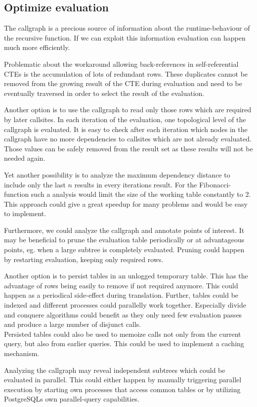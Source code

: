 \subsection{Optimize evaluation}

The callgraph is a precious source of information about the runtime-behaviour of the recursive function. If we can exploit this information evaluation can happen much more efficiently.

Problematic about the workaround allowing back-references in self-referential CTEs is the accumulation of lots of redundant rows. These duplicates cannot be removed from the growing result of the CTE during evaluation and need to be eventually traversed in order to select the result of the evaluation.

Another option is to use the callgraph to read only those rows which are required by later callsites. In each iteration of the evaluation, one topological level of the callgraph is evaluated. It is easy to check after each iteration which nodes in the callgraph have no more dependencies to callsites which are not already evaluated. Those values can be safely removed from the result set as these results will not be needed again.

Yet another possibility is to analyze the maximum dependency distance to include only the last $n$ results in every iterations result. For the Fibonacci-function such a analysis would limit the size of the working table constantly to 2. This approach could give a great speedup for many problems and would be easy to implement.

Furthermore, we could analyze the callgraph and annotate points of interest. It may be beneficial to prune the evaluation table periodically or at advantageous points, eg. when a large subtree is completely evaluated. Pruning could happen by restarting evaluation, keeping only required rows.

Another option is to persist tables in an unlogged temporary table. This has the advantage of rows being easily to remove if not required anymore. This could happen as a periodical side-effect during translation. Further, tables could be indexed and different processes could parallelly work together. Especially divide and conquere algorithms could benefit as they only need few evaluation passes and produce a large number of disjunct calls.\\
Persisted tables could also be used to memoize calls not only from the current query, but also from earlier queries. This could be used to implement a caching mechanism.

Analyzing the callgraph may reveal independent subtrees which could be evaluated in parallel. This could either happen by manually triggering parallel execution by starting own processes that access common tables or by utilizing PostgreSQLs own parallel-query capabilities. 